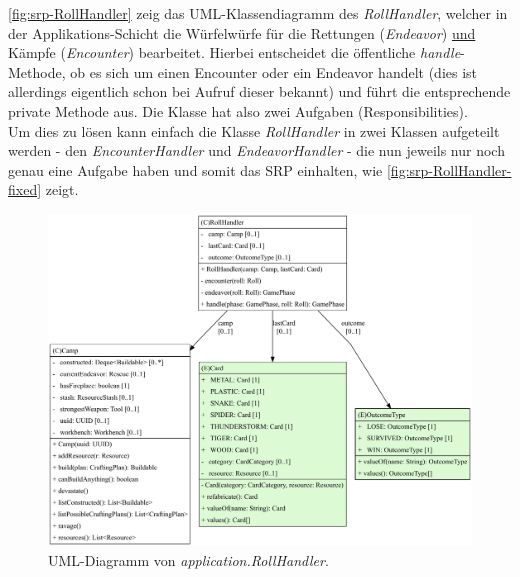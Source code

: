 \autoref{fig:srp-RollHandler} zeig das UML-Klassendiagramm des \textit{RollHandler}, welcher in der Applikations-Schicht
die Würfelwürfe für die Rettungen (\textit{Endeavor}) \underline{und} Kämpfe (\textit{Encounter}) bearbeitet. 
Hierbei entscheidet die öffentliche \textit{handle}-Methode, ob es sich um einen Encounter oder ein Endeavor handelt
(dies ist allerdings eigentlich schon bei Aufruf dieser bekannt)
und führt die entsprechende private Methode aus. Die Klasse hat also zwei Aufgaben (Responsibilities). \\
Um dies zu lösen kann einfach die Klasse \textit{RollHandler} in zwei Klassen aufgeteilt werden - 
den \textit{EncounterHandler} und \textit{EndeavorHandler} - die nun jeweils nur noch genau eine Aufgabe haben 
und somit das SRP einhalten, wie \autoref{fig:srp-RollHandler-fixed} zeigt. 

\begin{figure}[H]
	\centering
	\includegraphics[width=1.\textwidth]{Bilder/RollHandler_structure.pdf} 
	\caption{UML-Diagramm von \textit{application.RollHandler}.}
	\label{fig:srp-RollHandler}
\end{figure} 


